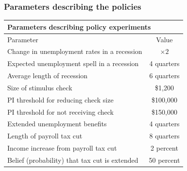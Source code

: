 \documentclass[pdflatex,aspectratio=169]{beamer}
\begin{document}
\begin{frame}
  \frametitle{Parameters describing the policies}
  \label{sli:policies}
  \begin{center}
    \begin{tabular}{lc}
      \hline
      \multicolumn{2}{l}{Parameters describing policy experiments} \\ \hline
      Parameter                                     & Value        \\ \hline
      Change in unemployment rates in a recession   & $\times 2$   \\
      Expected unemployment spell in a recession    & 4 quarters   \\
      Average length of recession                   & 6 quarters   \\
      Size of stimulus check                        & \$1,200      \\
      PI threshold for reducing check size          & \$100,000    \\
      PI threshold for not receiving check          & \$150,000    \\
      Extended unemployment benefits                & 4 quarters   \\
      Length of payroll tax cut                     & 8 quarters   \\
      Income increase from payroll tax cut          & 2 percent    \\
      Belief (probability) that tax cut is extended & 50 percent
      \\ \hline
    \end{tabular}
  \end{center}
  \vspace{.5cm}
  \hyperlink{Parameters}{}
\end{frame}
\end{document}
